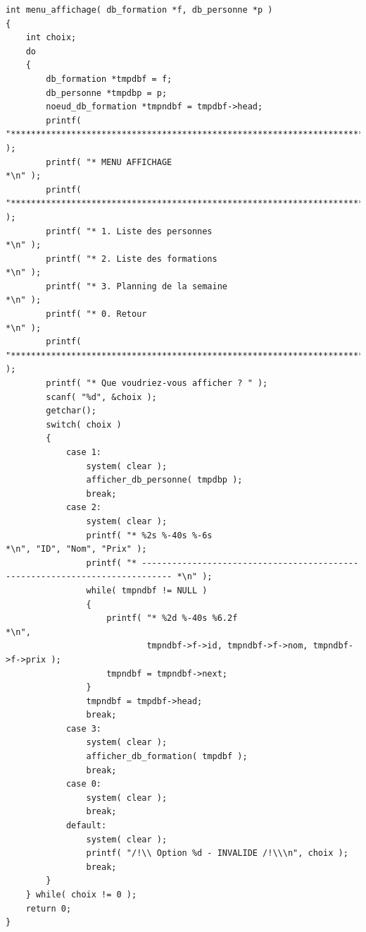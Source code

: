 \documentclass[11pt]{article}
\begin{document}
\begin{lstlisting}
int menu_affichage( db_formation *f, db_personne *p )
{
    int choix;
    do
    {
        db_formation *tmpdbf = f;
        db_personne *tmpdbp = p;
        noeud_db_formation *tmpndbf = tmpdbf->head;
        printf( "********************************************************************************\n" );
        printf( "* MENU AFFICHAGE                                                               *\n" );
        printf( "********************************************************************************\n" );
        printf( "* 1. Liste des personnes                                                       *\n" );
        printf( "* 2. Liste des formations                                                      *\n" );
        printf( "* 3. Planning de la semaine                                                    *\n" );
        printf( "* 0. Retour                                                                    *\n" );
        printf( "********************************************************************************\n" );
        printf( "* Que voudriez-vous afficher ? " );
        scanf( "%d", &choix );
        getchar();
        switch( choix )
        {
            case 1:
                system( clear );
                afficher_db_personne( tmpdbp );
                break;
            case 2:
                system( clear );
                printf( "* %2s %-40s %-6s                           *\n", "ID", "Nom", "Prix" );
                printf( "* ---------------------------------------------------------------------------- *\n" );
                while( tmpndbf != NULL )
                {
                    printf( "* %2d %-40s %6.2f                           *\n",
                            tmpndbf->f->id, tmpndbf->f->nom, tmpndbf->f->prix );
                    tmpndbf = tmpndbf->next;
                }
                tmpndbf = tmpdbf->head;
                break;
            case 3:
                system( clear );
                afficher_db_formation( tmpdbf );
                break;
            case 0:
                system( clear );
                break;
            default:
                system( clear );
                printf( "/!\\ Option %d - INVALIDE /!\\\n", choix );
                break;
        }
    } while( choix != 0 );
    return 0;
}


\end{lstlisting}
\end{document}
